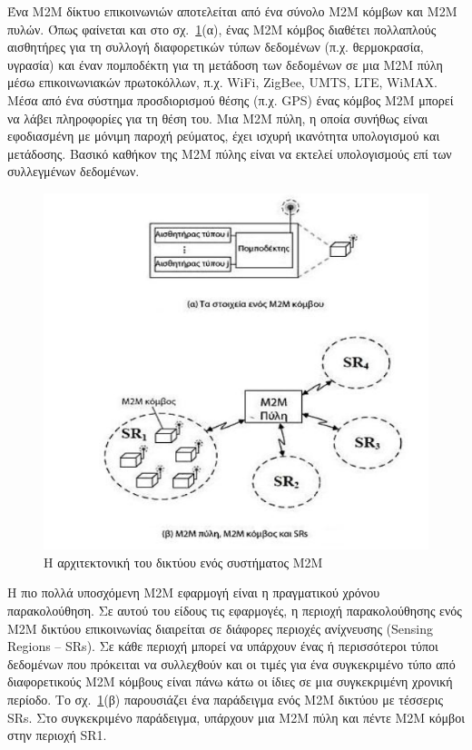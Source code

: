 \documentclass[12pt, a4paper, oneside]{report}
\begin{document}
Ένα Μ2Μ δίκτυο επικοινωνιών αποτελείται από ένα σύνολο Μ2Μ κόμβων και Μ2Μ πυλών. Όπως φαίνεται και στο σχ.~\ref{eik5}(α), ένας Μ2Μ κόμβος διαθέτει πολλαπλούς αισθητήρες για τη συλλογή διαφορετικών τύπων δεδομένων (π.χ. θερμοκρασία, υγρασία) και έναν πομποδέκτη για τη μετάδοση των δεδομένων σε μια Μ2Μ πύλη μέσω επικοινωνιακών πρωτοκόλλων, π.χ. WiFi, ZigBee, UMTS, LTE, WiMAX. Μέσα από ένα σύστημα προσδιορισμού θέσης (π.χ. GPS) ένας κόμβος Μ2Μ μπορεί να λάβει πληροφορίες για τη θέση του. Μια Μ2Μ πύλη, η οποία συνήθως είναι εφοδιασμένη με μόνιμη παροχή ρεύματος, έχει ισχυρή ικανότητα υπολογισμού και μετάδοσης. Βασικό καθήκον της Μ2Μ πύλης είναι να εκτελεί υπολογισμούς επί των συλλεγμένων δεδομένων.
\begin{figure}[!hb]
\centering
\includegraphics[scale=0.65]{eikona_05}
\caption[Η αρχιτεκτονική του δικτύου ενός συστήματος M2M]{Η αρχιτεκτονική του δικτύου ενός συστήματος M2M\cite{zwtou}}\label{eik5}
\end{figure}
\clearpage

Η πιο πολλά υποσχόμενη Μ2Μ εφαρμογή είναι η πραγματικού χρόνου παρακολούθηση. Σε αυτού του είδους τις εφαρμογές, η περιοχή παρακολούθησης ενός Μ2Μ δικτύου επικοινωνίας διαιρείται σε διάφορες περιοχές ανίχνευσης (Sensing Regions – SRs). Σε κάθε περιοχή μπορεί να υπάρχουν ένας ή περισσότεροι τύποι δεδομένων που πρόκειται να συλλεχθούν και οι τιμές για ένα συγκεκριμένο τύπο από διαφορετικούς Μ2Μ κόμβους είναι πάνω κάτω οι ίδιες σε μια συγκεκριμένη χρονική περίοδο. Το σχ.~\ref{eik5}(β) παρουσιάζει ένα παράδειγμα ενός Μ2Μ δικτύου με τέσσερις SRs. Στο συγκεκριμένο παράδειγμα, υπάρχουν μια Μ2Μ πύλη και πέντε Μ2Μ κόμβοι στην περιοχή SR1.
\end{document}
